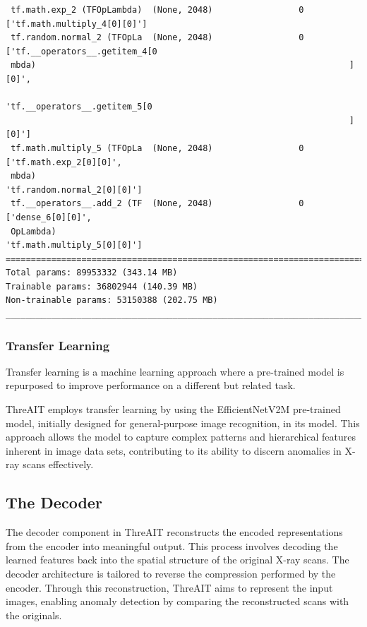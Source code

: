 \documentclass{article}
\begin{document}
\begin{verbatim}
 tf.math.exp_2 (TFOpLambda)  (None, 2048)                 0         ['tf.math.multiply_4[0][0]']  
 tf.random.normal_2 (TFOpLa  (None, 2048)                 0         ['tf.__operators__.getitem_4[0
 mbda)                                                              ][0]',                        
                                                                     'tf.__operators__.getitem_5[0
                                                                    ][0]']                        
 tf.math.multiply_5 (TFOpLa  (None, 2048)                 0         ['tf.math.exp_2[0][0]',       
 mbda)                                                               'tf.random.normal_2[0][0]']  
 tf.__operators__.add_2 (TF  (None, 2048)                 0         ['dense_6[0][0]',             
 OpLambda)                                                           'tf.math.multiply_5[0][0]']  
==================================================================================================
Total params: 89953332 (343.14 MB)
Trainable params: 36802944 (140.39 MB)
Non-trainable params: 53150388 (202.75 MB)
__________________________________________________________________________________________________
\end{verbatim}

\subsubsection{Transfer Learning}
Transfer learning is a machine learning approach where a pre-trained model is repurposed to improve performance on a different but related task.

ThreAIT employs transfer learning by using the EfficientNetV2M pre-trained model, initially designed for general-purpose image recognition, in its model. This approach allows the model to capture complex patterns and hierarchical features inherent in image data sets, contributing to its ability to discern anomalies in X-ray scans effectively.

\subsection{The Decoder}
The decoder component in ThreAIT reconstructs the encoded representations from the encoder into meaningful output. This process involves decoding the learned features back into the spatial structure of the original X-ray scans. The decoder architecture is tailored to reverse the compression performed by the encoder. Through this reconstruction, ThreAIT aims to represent the input images, enabling anomaly detection by comparing the reconstructed scans with the originals.
\end{document}
